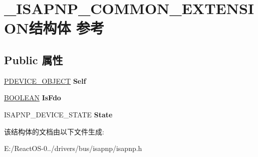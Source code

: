 \hypertarget{struct___i_s_a_p_n_p___c_o_m_m_o_n___e_x_t_e_n_s_i_o_n}{}\section{\+\_\+\+I\+S\+A\+P\+N\+P\+\_\+\+C\+O\+M\+M\+O\+N\+\_\+\+E\+X\+T\+E\+N\+S\+I\+O\+N结构体 参考}
\label{struct___i_s_a_p_n_p___c_o_m_m_o_n___e_x_t_e_n_s_i_o_n}
\subsection*{Public 属性}
\begin{DoxyCompactItemize}
\item 
\mbox{\label{struct___i_s_a_p_n_p___c_o_m_m_o_n___e_x_t_e_n_s_i_o_n_a58df3448d475de3eac3a862862bee947}} 
\hyperlink{struct___d_e_v_i_c_e___o_b_j_e_c_t}{P\+D\+E\+V\+I\+C\+E\+\_\+\+O\+B\+J\+E\+CT} {\bfseries Self}
\item 
\mbox{\label{struct___i_s_a_p_n_p___c_o_m_m_o_n___e_x_t_e_n_s_i_o_n_afca9d781889016b83e17c28be9ea11c7}} 
\hyperlink{_processor_bind_8h_a112e3146cb38b6ee95e64d85842e380a}{B\+O\+O\+L\+E\+AN} {\bfseries Is\+Fdo}
\item 
\mbox{\label{struct___i_s_a_p_n_p___c_o_m_m_o_n___e_x_t_e_n_s_i_o_n_aee2cd9ec56f6c8d4d44b1cea458cc3bd}} 
I\+S\+A\+P\+N\+P\+\_\+\+D\+E\+V\+I\+C\+E\+\_\+\+S\+T\+A\+TE {\bfseries State}
\end{DoxyCompactItemize}


该结构体的文档由以下文件生成\+:\begin{DoxyCompactItemize}
\item 
E\+:/\+React\+O\+S-\/0../drivers/bus/isapnp/isapnp.\+h\end{DoxyCompactItemize}
